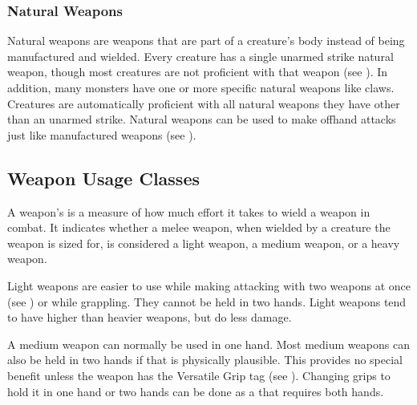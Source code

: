         \subsubsection{Natural Weapons}\label{Natural Weapons}
            Natural weapons are weapons that are part of a creature's body instead of being manufactured and wielded.
            Every creature has a single unarmed strike natural weapon, though most creatures are not proficient with that weapon (see ).
            In addition, many monsters have one or more specific natural weapons like claws.
            Creatures are automatically proficient with all natural weapons they have other than an unarmed strike.
            Natural weapons can be used to make offhand attacks just like manufactured weapons (see ).

    \subsection{Weapon Usage Classes}\label{Weapon Usage Classes}
        A weapon's  is a measure of how much effort it takes to wield a weapon in combat.
        It indicates whether a melee weapon, when wielded by a creature the weapon is sized for, is considered a light weapon, a medium weapon, or a heavy weapon.


        \label{Light Weapons} Light weapons are easier to use while making attacking with two weapons at once (see ) or while grappling.
        They cannot be held in two hands.
        Light weapons tend to have higher  than heavier weapons, but do less damage.

         A medium weapon can normally be used in one hand.
        Most medium weapons can also be held in two hands if that is physically plausible.
        This provides no special benefit unless the weapon has the Versatile Grip tag (see ).
        Changing grips to hold it in one hand or two hands can be done as a  that requires both hands.

